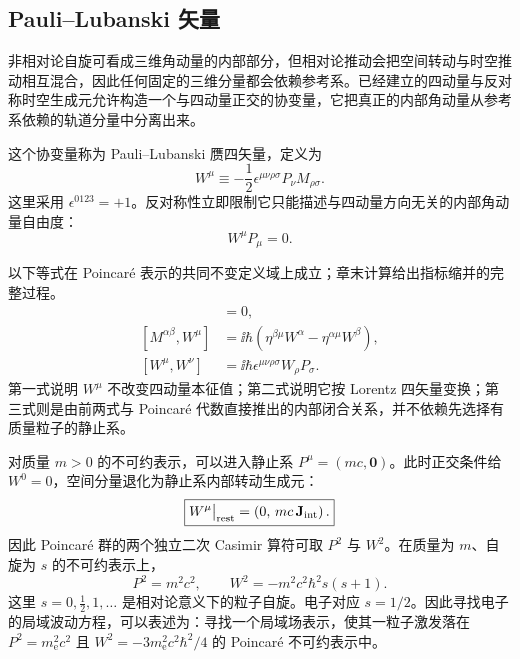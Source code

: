 \subsection{Pauli--Lubanski 矢量}

非相对论自旋可看成三维角动量的内部部分，但相对论推动会把空间转动与时空推动相互混合，因此任何固定的三维分量都会依赖参考系。已经建立的四动量与反对称时空生成元允许构造一个与四动量正交的协变量，它把真正的内部角动量从参考系依赖的轨道分量中分离出来。

\begin{definition}
这个协变量称为 Pauli--Lubanski 赝四矢量，定义为
\begin{equation}
 \boxed{
 W^\mu\equiv-\frac12\epsilon^{\mu\nu\rho\sigma}
 P_\nu M_{\rho\sigma}.}
 \label{eq:pauli-lubanski}
\end{equation}
这里采用 $\epsilon^{0123}=+1$。反对称性立即限制它只能描述与四动量方向无关的内部角动量自由度：
\begin{equation}
 W^\mu P_\mu=0.
 \label{eq:W-orthogonality-dp34}
\end{equation}

\end{definition}

\begin{proposition}
以下等式在 Poincar\'e 表示的共同不变定义域上成立；章末计算给出指标缩并的完整过程。
\begin{align}
 [W^\mu,P^\lambda]&=0,
 \label{eq:w-p}\\
 [M^{\alpha\beta},W^\mu]
 &=\ii\hbar\left(
 \eta^{\beta\mu}W^\alpha-
 \eta^{\alpha\mu}W^\beta\right),
 \label{eq:m-w}\\
 [W^\mu,W^\nu]
 &=\ii\hbar\epsilon^{\mu\nu\rho\sigma}W_\rho P_\sigma.
 \label{eq:w-w-dp34}
\end{align}
第一式说明 $W^\mu$ 不改变四动量本征值；第二式说明它按 Lorentz 四矢量变换；第三式则是由前两式与 Poincar\'e 代数直接推出的内部闭合关系，并不依赖先选择有质量粒子的静止系。

\end{proposition}

\begin{proposition}
对质量 $m>0$ 的不可约表示，可以进入静止系
$P^\mu=(mc,\mathbf0)$。此时正交条件给 $W^0=0$，空间分量退化为静止系内部转动生成元：
\begin{equation}
 \boxed{
 W^\mu\big|_{\rm rest}
 =\left(0,\,mc\,\mathbf J_{\rm int}\right).}
 \label{eq:W-rest-r13}
\end{equation}
因此 Poincar\'e 群的两个独立二次 Casimir 算符可取 $P^2$ 与 $W^2$。在质量为 $m$、自旋为 $s$ 的不可约表示上，
\begin{equation}
 \boxed{
 P^2=m^2c^2,
 \qquad
 W^2=-m^2c^2\hbar^2s(s+1).}
 \label{eq:poincare-casimirs}
\end{equation}
这里 $s=0,\frac12,1,\ldots$ 是相对论意义下的粒子自旋。电子对应 $s=1/2$。因此寻找电子的局域波动方程，可以表述为：寻找一个局域场表示，使其一粒子激发落在 $P^2=m_{\mathrm e}^2c^2$ 且 $W^2=-3m_{\mathrm e}^2c^2\hbar^2/4$ 的 Poincar\'e 不可约表示中。

\end{proposition}

